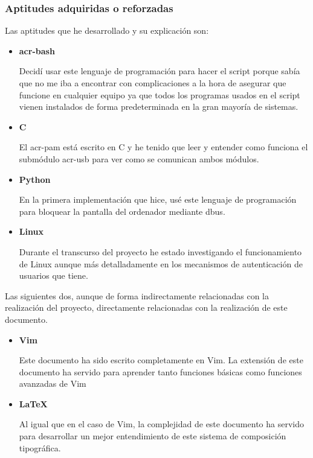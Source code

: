\documentclass[twoside, titlepage, 12pt, a4paper]{article}
\begin{document}
\subsubsection{Aptitudes adquiridas o reforzadas}
Las aptitudes que he desarrollado y su explicación son:
\begin{itemize}
	\item{\textbf{\gls{acr-bash}}}\par Decidí usar este lenguaje de programación para hacer el \gls{script} porque sabía que no me iba a encontrar con complicaciones a la hora de asegurar que funcione en cualquier equipo ya que todos los programas usados en el script vienen instalados de forma predeterminada en la gran mayoría de sistemas.
	\item{\textbf{\gls{C}}}\par El \gls{acr-pam} está escrito en \gls{C} y he tenido que leer y entender como funciona el submódulo \gls{acr-usb} para ver como se comunican ambos módulos.
	\item{\textbf{\gls{Python}}}\par En la primera implementación que hice, usé este lenguaje de programación para bloquear la pantalla del ordenador mediante \gls{dbus}.
	\item{\textbf{\gls{Linux}}}\par Durante el transcurso del proyecto he estado investigando el funcionamiento de \gls{Linux} aunque más detalladamente en los mecanismos de autenticación de usuarios que tiene.
\end{itemize}
Las siguientes dos, aunque de forma indirectamente relacionadas con la realización del proyecto, directamente relacionadas con la realización de este documento.
\begin{itemize}
	\item{\textbf{\gls{Vim}}}\par Este documento ha sido escrito completamente en \gls{Vim}. La extensión de este documento ha servido para aprender tanto funciones básicas como funciones avanzadas de \gls{Vim}
	\item{\textbf{\LaTeX{}}}\par Al igual que en el caso de \gls{Vim}, la complejidad de este documento ha servido para desarrollar un mejor entendimiento de este sistema de composición tipográfica.
\end{itemize}
\end{document}
